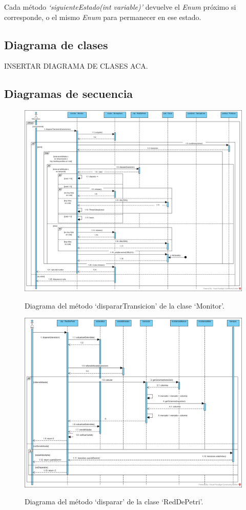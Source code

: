 \documentclass[12pt,a4paper]{article}
\begin{document}
Cada método \textit{`siguienteEstado(int variable)'} devuelve el \textit{Enum} próximo si corresponde, o el mismo \textit{Enum} para permanecer en ese estado.

\subsection{Diagrama de clases}
INSERTAR DIAGRAMA DE CLASES ACA.

\subsection{Diagramas de secuencia}
\begin{figure}[H]
    \centering
    \includegraphics[scale=0.35]{DSmonitor.png}
    \label{fig:dsmonitor}
    \caption{Diagrama del método `dispararTransicion' de la clase `Monitor'.}
\end{figure}

\begin{figure}[H]
    \centering
    \includegraphics[scale=0.35]{DSdisparo.png}
    \label{fig:dsmonitor}
    \caption{Diagrama del método `disparar' de la clase `RedDePetri'.}
\end{figure}
\end{document}
